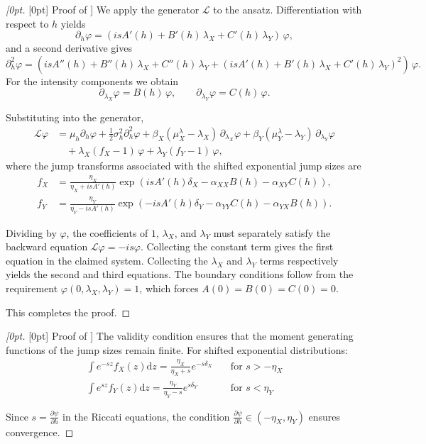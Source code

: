 \documentclass{article}
\newcommand{\diff}{\mathrm{d}}
\newcommand{\pard}[2]{\frac{\partial #1}{\partial #2}}
\theoremstyle{definition}
\newenvironment{delayedproof}[1]
 {\begin{proof}[\raisedtarget{#1}Proof of \Cref{#1}]}
 {\end{proof}}
\newcommand{\raisedtarget}[1]{%
  \raisebox{\fontcharht\font`P}[0pt][0pt]{\hypertarget{#1}{}}%
}
\begin{document}
\begin{delayedproof}{prop:riccati}
We apply the generator $\mathcal{L}$ to the ansatz. Differentiation with respect to $h$ yields
\[
\partial_h \varphi 
= \left( i s A'(h) + B'(h)\,\lambda_X + C'(h)\,\lambda_Y \right)\,\varphi,
\]
and a second derivative gives
\[
\partial_h^2 \varphi 
= \left( i s A''(h) + B''(h)\,\lambda_X + C''(h)\,\lambda_Y 
+ \left(i s A'(h) + B'(h)\,\lambda_X + C'(h)\,\lambda_Y\right)^2 \right)\,\varphi.
\]
For the intensity components we obtain
\[
\partial_{\lambda_X}\varphi = B(h)\,\varphi, 
\qquad 
\partial_{\lambda_Y}\varphi = C(h)\,\varphi.
\]

Substituting into the generator,
\[
\begin{aligned}
\mathcal{L}\varphi &= 
\mu_h \partial_h \varphi 
+ \frac{1}{2}\sigma_h^2 \partial_h^2 \varphi
+ \beta_X(\mu_X^\lambda - \lambda_X)\,\partial_{\lambda_X}\varphi
+ \beta_Y(\mu_Y^\lambda - \lambda_Y)\,\partial_{\lambda_Y}\varphi \\
&\quad + \lambda_X(f_X - 1)\,\varphi + \lambda_Y(f_Y - 1)\,\varphi,
\end{aligned}
\]
where the jump transforms associated with the shifted exponential jump sizes are
\[
\begin{aligned}
f_X &= \frac{\eta_X}{\eta_X + i s A'(h)} 
\exp\!\left( i s A'(h)\delta_X - \alpha_{XX} B(h) - \alpha_{XY} C(h) \right), \\
f_Y &= \frac{\eta_Y}{\eta_Y - i s A'(h)} 
\exp\!\left( -i s A'(h)\delta_Y - \alpha_{YY} C(h) - \alpha_{YX} B(h) \right).
\end{aligned}
\]

Dividing by $\varphi$, the coefficients of $1$, $\lambda_X$, and $\lambda_Y$ must separately satisfy the backward equation $\mathcal{L}\varphi = -i s \varphi$. Collecting the constant term gives the first equation in the claimed system. Collecting the $\lambda_X$ and $\lambda_Y$ terms respectively yields the second and third equations. The boundary conditions follow from the requirement $\varphi(0, \lambda_X, \lambda_Y) = 1$, which forces $A(0)=B(0)=C(0)=0$.

This completes the proof.
\end{delayedproof}

\begin{delayedproof}{prop:validity}
The validity condition ensures that the moment generating functions of the jump sizes remain finite. For shifted exponential distributions:
\begin{align}
\int e^{-sz} f_X(z) \diff z = \frac{\eta_X}{\eta_X + s} e^{-s\delta_X} \quad &\text{for } s > -\eta_X \\
\int e^{sz} f_Y(z) \diff z = \frac{\eta_Y}{\eta_Y - s} e^{s\delta_Y} \quad &\text{for } s < \eta_Y
\end{align}

Since $s = \pard{\psi}{h}$ in the Riccati equations, the condition $\pard{\psi}{h} \in (-\eta_X, \eta_Y)$ ensures convergence.
\end{delayedproof}
\end{document}
